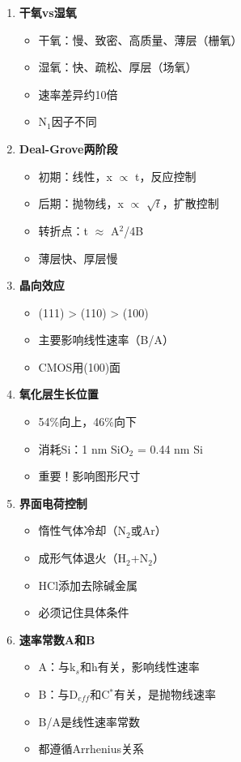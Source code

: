 \documentclass[UTF8,12pt,a4paper]{ctexart}
\begin{document}
\begin{enumerate}
    \item \textbf{干氧vs湿氧}
    \begin{itemize}
        \item 干氧：慢、致密、高质量、薄层（栅氧）
        \item 湿氧：快、疏松、厚层（场氧）
        \item 速率差异约10倍
        \item N$_1$因子不同
    \end{itemize}
    
    \item \textbf{Deal-Grove两阶段}
    \begin{itemize}
        \item 初期：线性，x $\propto$ t，反应控制
        \item 后期：抛物线，x $\propto$ $\sqrt{t}$，扩散控制
        \item 转折点：t $\approx$ A$^2$/4B
        \item 薄层快、厚层慢
    \end{itemize}
    
    \item \textbf{晶向效应}
    \begin{itemize}
        \item (111) > (110) > (100)
        \item 主要影响线性速率（B/A）
        \item CMOS用(100)面
    \end{itemize}
    
    \item \textbf{氧化层生长位置}
    \begin{itemize}
        \item 54\%向上，46\%向下
        \item 消耗Si：1 nm SiO$_2$ = 0.44 nm Si
        \item 重要！影响图形尺寸
    \end{itemize}
    
    \item \textbf{界面电荷控制}
    \begin{itemize}
        \item 惰性气体冷却（N$_2$或Ar）
        \item 成形气体退火（H$_2$+N$_2$）
        \item HCl添加去除碱金属
        \item 必须记住具体条件
    \end{itemize}
    
    \item \textbf{速率常数A和B}
    \begin{itemize}
        \item A：与k$_s$和h有关，影响线性速率
        \item B：与D$_{eff}$和C$^*$有关，是抛物线速率
        \item B/A是线性速率常数
        \item 都遵循Arrhenius关系
    \end{itemize}
\end{enumerate}
\end{document}
